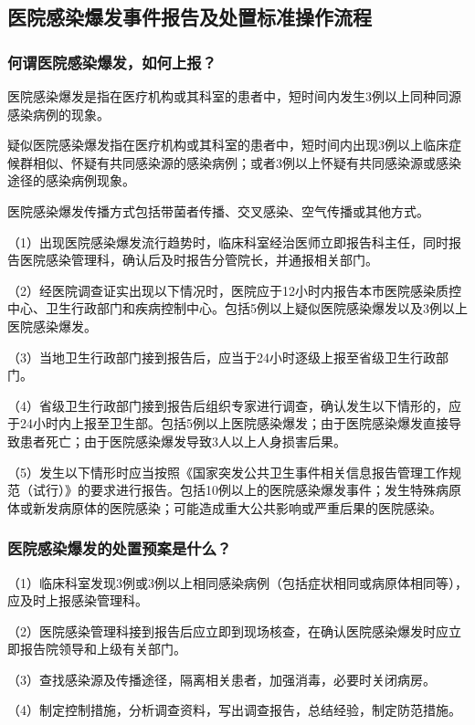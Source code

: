 \subsection{医院感染爆发事件报告及处置标准操作流程}

\subsubsection{何谓医院感染爆发，如何上报？}

医院感染爆发是指在医疗机构或其科室的患者中，短时间内发生3例以上同种同源感染病例的现象。

疑似医院感染爆发指在医疗机构或其科室的患者中，短时间内出现3例以上临床症候群相似、怀疑有共同感染源的感染病例；或者3例以上怀疑有共同感染源或感染途径的感染病例现象。

医院感染爆发传播方式包括带菌者传播、交叉感染、空气传播或其他方式。

（1）出现医院感染爆发流行趋势时，临床科室经治医师立即报告科主任，同时报告医院感染管理科，确认后及时报告分管院长，并通报相关部门。

（2）经医院调查证实出现以下情况时，医院应于12小时内报告本市医院感染质控中心、卫生行政部门和疾病控制中心。包括5例以上疑似医院感染爆发以及3例以上医院感染爆发。

（3）当地卫生行政部门接到报告后，应当于24小时逐级上报至省级卫生行政部门。

（4）省级卫生行政部门接到报告后组织专家进行调查，确认发生以下情形的，应于24小时内上报至卫生部。包括5例以上医院感染爆发；由于医院感染爆发直接导致患者死亡；由于医院感染爆发导致3人以上人身损害后果。

（5）发生以下情形时应当按照《国家突发公共卫生事件相关信息报告管理工作规范（试行）》的要求进行报告。包括10例以上的医院感染爆发事件；发生特殊病原体或新发病原体的医院感染；可能造成重大公共影响或严重后果的医院感染。

\subsubsection{医院感染爆发的处置预案是什么？}

（1）临床科室发现3例或3例以上相同感染病例（包括症状相同或病原体相同等），应及时上报感染管理科。

（2）医院感染管理科接到报告后应立即到现场核查，在确认医院感染爆发时应立即报告院领导和上级有关部门。

（3）查找感染源及传播途径，隔离相关患者，加强消毒，必要时关闭病房。

（4）制定控制措施，分析调查资料，写出调查报告，总结经验，制定防范措施。

